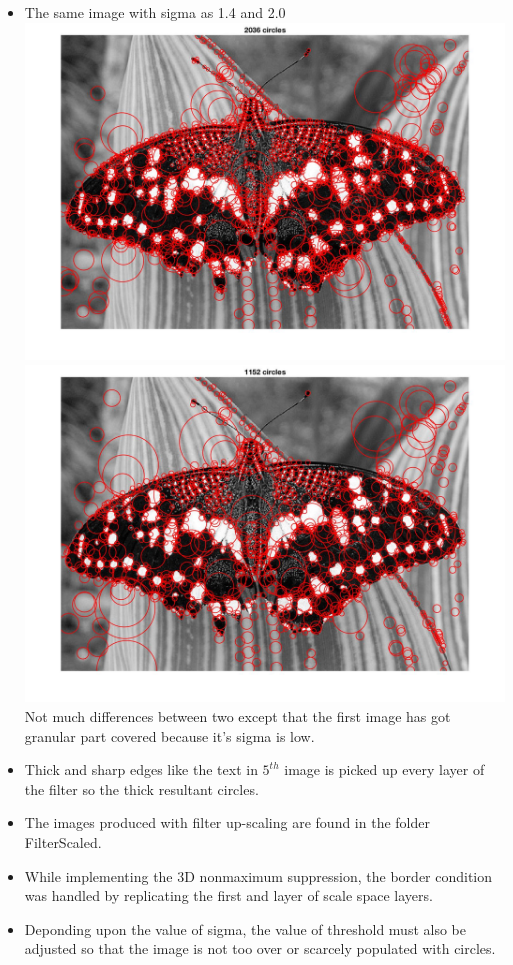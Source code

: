 \documentclass[a4paper,11pt]{article}
\begin{document}
\begin{itemize}
	\item The same image with sigma as 1.4 and 2.0\\
	\includegraphics[scale=0.25]{hw2/code/1}\\
	\includegraphics[scale=0.25]{hw2/code/1_1}\\
	Not much differences between two except that the first image has got granular part covered because it's sigma is low.
	\item Thick and sharp edges like the text in $5^{th}$ image is picked up every layer of the filter so the thick resultant circles.
	\item The images produced with filter up-scaling are found in the folder FilterScaled.
	\item While implementing the 3D nonmaximum suppression, the border condition was handled by replicating the first and layer of scale space layers.
	\item Deponding upon the value of sigma, the value of threshold must also be adjusted so that the image is not too over or scarcely populated with circles.
	
\end{itemize}
\end{document}
